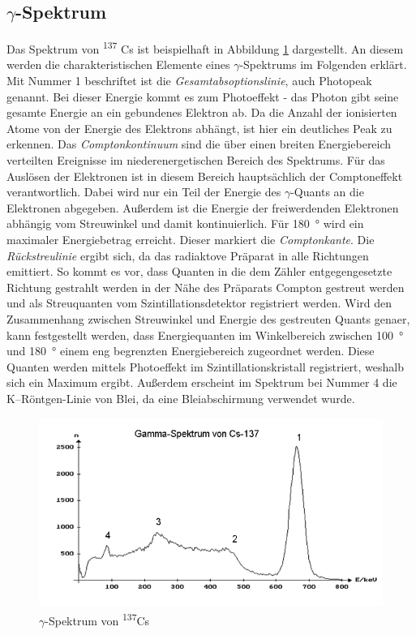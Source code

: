 \documentclass[a4paper,twoside,final]{article}
\begin{document}
\subsection{$\gamma$-Spektrum}
Das Spektrum von \textsuperscript{137} Cs ist beispielhaft in Abbildung \ref{figCsSpek} dargestellt. An diesem werden die charakteristischen Elemente eines $\gamma$-Spektrums im Folgenden erklärt. \\
Mit Nummer 1 beschriftet ist die \textit{Gesamtabsoptionslinie}, auch Photopeak genannt. Bei dieser Energie kommt es zum Photoeffekt - das Photon gibt seine gesamte Energie an ein gebundenes Elektron ab. Da die Anzahl der ionisierten Atome von der Energie des Elektrons abhängt, ist hier ein deutliches Peak zu erkennen. Das \textit{Comptonkontinuum} sind die über einen breiten Energiebereich verteilten Ereignisse im niederenergetischen Bereich des Spektrums. Für das Auslösen der Elektronen ist in diesem Bereich hauptsächlich der Comptoneffekt verantwortlich. Dabei wird nur ein Teil der Energie des $\gamma$-Quants an die Elektronen abgegeben. Außerdem ist die Energie der freiwerdenden Elektronen abhängig vom Streuwinkel und damit kontinuierlich. Für \SI{180}{\degree} wird ein maximaler Energiebetrag erreicht. Dieser markiert die \textit{Comptonkante}. Die \textit{Rückstreulinie} ergibt sich, da das radiaktove Präparat in alle Richtungen emittiert. So kommt es vor, dass Quanten in die dem Zähler entgegengesetzte Richtung gestrahlt werden in der Nähe des Präparats Compton gestreut werden und als Streuquanten vom Szintillationsdetektor registriert werden. Wird den Zusammenhang zwischen Streuwinkel und Energie des gestreuten Quants genaer, kann festgestellt werden, dass Energiequanten im Winkelbereich zwischen \SI{100}{\degree} und \SI{180}{\degree} einem eng begrenzten Energiebereich zugeordnet werden. Diese Quanten werden mittels Photoeffekt im Szintillationskristall registriert, weshalb sich ein Maximum ergibt. Außerdem erscheint im Spektrum bei Nummer 4 die K--Röntgen-Linie von Blei, da eine Bleiabschirmung verwendet wurde.

\begin{figure}[htp]
    \centering
    \includegraphics{Bilder/SpektrumCs.png}
    \caption{$\gamma$-Spektrum von \textsuperscript{137}Cs}
    \label{figCsSpek}
\end{figure}
\end{document}
